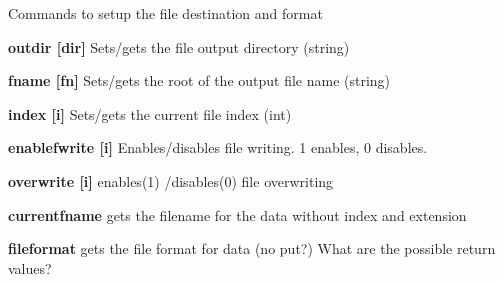Commands to setup the file destination and format


\begin{DoxyItemize}
\item {\bfseries outdir \mbox{[}dir\mbox{]}} Sets/gets the file output directory (string)
\end{DoxyItemize}


\begin{DoxyItemize}
\item {\bfseries fname \mbox{[}fn\mbox{]}} Sets/gets the root of the output file name (string)
\end{DoxyItemize}


\begin{DoxyItemize}
\item {\bfseries index \mbox{[}i\mbox{]}} Sets/gets the current file index (int)
\end{DoxyItemize}


\begin{DoxyItemize}
\item {\bfseries enablefwrite \mbox{[}i\mbox{]}} Enables/disables file writing. 1 enables, 0 disables.
\end{DoxyItemize}


\begin{DoxyItemize}
\item {\bfseries overwrite \mbox{[}i\mbox{]}} enables(1) /disables(0) file overwriting
\end{DoxyItemize}


\begin{DoxyItemize}
\item {\bfseries currentfname} gets the filename for the data without index and extension
\end{DoxyItemize}


\begin{DoxyItemize}
\item {\bfseries fileformat} gets the file format for data (no put?) What are the possible return values? 
\end{DoxyItemize}